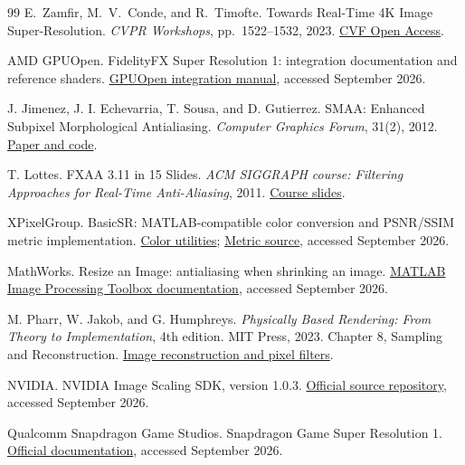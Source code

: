 \documentclass[10pt,twocolumn,letterpaper]{article}
\begin{document}
\begin{thebibliography}{99}
E.~Zamfir, M.~V.~Conde, and R.~Timofte.
Towards Real-Time 4K Image Super-Resolution.
\emph{CVPR Workshops}, pp.~1522--1532, 2023.
\href{https://openaccess.thecvf.com/content/CVPR2023W/NTIRE/html/Zamfir_Towards_Real-Time_4K_Image_Super-Resolution_CVPRW_2023_paper.html}{CVF Open Access}.

AMD GPUOpen.
FidelityFX Super Resolution 1: integration documentation and reference shaders.
\href{https://gpuopen.com/manuals/fidelityfx_sdk/techniques/super-resolution-spatial/}{GPUOpen integration manual}, accessed September 2026.

J. Jimenez, J. I. Echevarria, T. Sousa, and D. Gutierrez.
SMAA: Enhanced Subpixel Morphological Antialiasing.
\emph{Computer Graphics Forum}, 31(2), 2012.
\href{https://www.iryoku.com/smaa/}{Paper and code}.

T. Lottes.
FXAA 3.11 in 15 Slides.
\emph{ACM SIGGRAPH course: Filtering Approaches for Real-Time Anti-Aliasing}, 2011.
\href{https://www.iryoku.com/aacourse/downloads/09-FXAA-3.11-in-15-Slides.pdf}{Course slides}.

XPixelGroup.
BasicSR: MATLAB-compatible color conversion and PSNR/SSIM metric implementation.
\href{https://github.com/XPixelGroup/BasicSR/blob/master/basicsr/utils/color_util.py}{Color utilities};
\href{https://github.com/XPixelGroup/BasicSR/blob/master/basicsr/metrics/psnr_ssim.py}{Metric source}, accessed September 2026.

MathWorks.
Resize an Image: antialiasing when shrinking an image.
\href{https://www.mathworks.com/help/images/resize-an-image.html}{MATLAB Image Processing Toolbox documentation}, accessed September 2026.

M. Pharr, W. Jakob, and G. Humphreys.
\emph{Physically Based Rendering: From Theory to Implementation}, 4th edition.
MIT Press, 2023. Chapter 8, Sampling and Reconstruction.
\href{https://www.pbr-book.org/4ed/Sampling_and_Reconstruction/Image_Reconstruction}{Image reconstruction and pixel filters}.

NVIDIA.
NVIDIA Image Scaling SDK, version 1.0.3.
\href{https://github.com/NVIDIAGameWorks/NVIDIAImageScaling}{Official source repository}, accessed September 2026.

Qualcomm Snapdragon Game Studios.
Snapdragon Game Super Resolution 1.
\href{https://github.com/SnapdragonGameStudios/snapdragon-gsr/blob/main/sgsr/v1/README.md}{Official documentation}, accessed September 2026.


\end{thebibliography}
\end{document}

